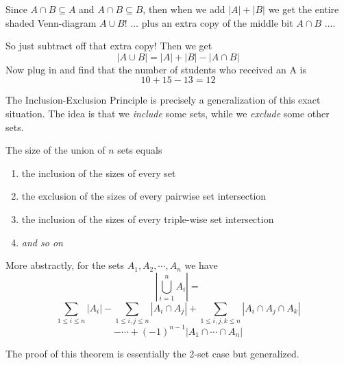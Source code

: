 \documentclass[main.tex]{subfiles}
\begin{document}
\begin{example}
	Since \(A \cap B \subseteq A\) and \(A \cap B \subseteq B\), then when we add \(|A| + |B|\) we get the entire shaded Venn-diagram \(A \cup B\)! \(\dots\) plus an extra copy of the middle bit \(A \cap B\) \(\dots\).
	
	So just subtract off that extra copy! Then we get \[|A \cup B| = |A| + |B| - |A \cap B|\]
	Now plug in and find that the number of students who received an A is \[10 + 15 - 13 = 12\]
\end{example}

The Inclusion-Exclusion Principle is precisely a generalization of this exact situation. The idea is that we \textit{include} some sets, while we \textit{exclude} some other sets.

\begin{thm}
	The size of the union of \(n\) sets equals
	\begin{enumerate}
		\item the inclusion of the sizes of every set
		\item the exclusion of the sizes of every pairwise set intersection
		\item the inclusion of the sizes of every triple-wise set intersection
		\item \textit{and so on}
	\end{enumerate}
	
	More abstractly, for the sets \(A_1,A_2,\cdots,A_n\) we have
	\[|\bigcup_{i=1}^{n} A_i| =\]
	\[\sum_{1 \leq i \leq n} |A_i| - \sum_{1 \leq i,j \leq n} |A_i \cap A_j| + \sum_{1 \leq i,j,k \leq n} |A_i \cap A_j \cap A_k|\]\[- \cdots + (-1)^{n-1}|A_1 \cap \cdots \cap A_n|\]
\end{thm}

\begin{rem}
	The proof of this theorem is essentially the 2-set case but generalized.
\end{rem}
\end{document}
